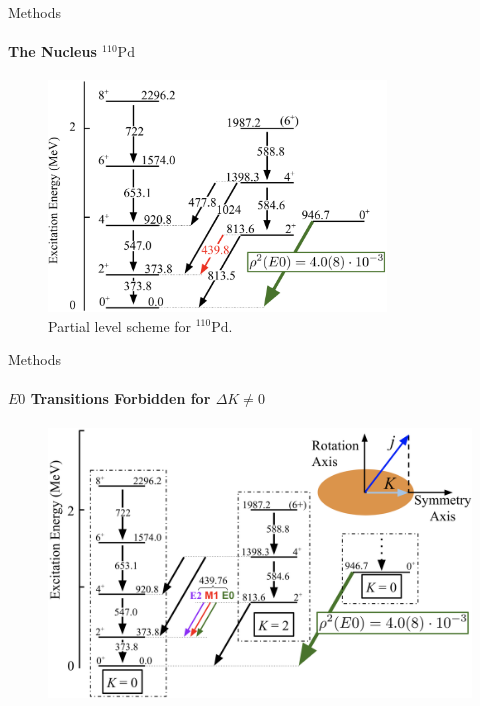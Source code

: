 \documentclass{beamer}
\begin{document}





\begin{frame}{Methods}
\framesubtitle{The Nucleus $^{110}\mathrm{Pd}$}
\begin{figure}[!hht]
  \centering
  \includegraphics[width=0.8\textwidth, keepaspectratio]{110PdLevels.png}
  \caption{Partial level scheme for $^{110}\mathrm{Pd}$\footnotemark[1].}
  \label{comparison}
\end{figure}
\end{frame}

\begin{frame}{Methods}
\framesubtitle{$E0$ Transitions Forbidden for $\Delta K \neq 0$}
\begin{figure}[!hht]
  \centering
  \includegraphics[width=\textwidth, keepaspectratio]{LevelsWithK.png}
\end{figure}
\end{frame}
\end{document}
